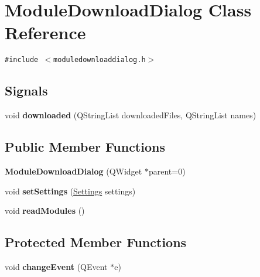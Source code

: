 \hypertarget{classModuleDownloadDialog}{
\section{ModuleDownloadDialog Class Reference}
\label{classModuleDownloadDialog}
}
{\tt \#include $<$moduledownloaddialog.h$>$}

\subsection*{Signals}
\begin{CompactItemize}
\item 
\hypertarget{classModuleDownloadDialog_285d9619e209258c79f40dc34b8682d4}{
void \textbf{downloaded} (QStringList downloadedFiles, QStringList names)}
\label{classModuleDownloadDialog_285d9619e209258c79f40dc34b8682d4}

\end{CompactItemize}
\subsection*{Public Member Functions}
\begin{CompactItemize}
\item 
\hypertarget{classModuleDownloadDialog_893c5c6dfa7680361af886502a0f80e3}{
\textbf{ModuleDownloadDialog} (QWidget $\ast$parent=0)}
\label{classModuleDownloadDialog_893c5c6dfa7680361af886502a0f80e3}

\item 
\hypertarget{classModuleDownloadDialog_471587fb7073ab5113bfed9f46aca5f7}{
void \textbf{setSettings} (\hyperlink{classSettings}{Settings} settings)}
\label{classModuleDownloadDialog_471587fb7073ab5113bfed9f46aca5f7}

\item 
\hypertarget{classModuleDownloadDialog_f63cad20b2af821018617fb49f2c3e77}{
void \textbf{readModules} ()}
\label{classModuleDownloadDialog_f63cad20b2af821018617fb49f2c3e77}

\end{CompactItemize}
\subsection*{Protected Member Functions}
\begin{CompactItemize}
\item 
\hypertarget{classModuleDownloadDialog_6b1d8ab0687323e33b28ed53a9f1f341}{
void \textbf{changeEvent} (QEvent $\ast$e)}
\label{classModuleDownloadDialog_6b1d8ab0687323e33b28ed53a9f1f341}

\end{CompactItemize}


